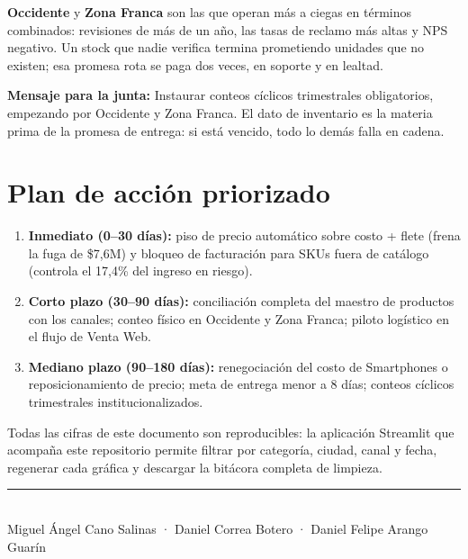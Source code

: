 \documentclass[11pt,letterpaper]{article}
\newcommand{\mensajeclave}[1]{%
  \vspace{4pt}
  \noindent\colorbox{grisclaro}{\parbox{\dimexpr\linewidth-2\fboxsep}{%
    \textbf{\textcolor{azuloscuro}{Mensaje para la junta:}} #1}}
  \vspace{4pt}
}
\begin{document}
\textbf{Occidente} y \textbf{Zona Franca} son las que operan más a ciegas en
términos combinados: revisiones de más de un año, las tasas de reclamo más
altas y NPS negativo. Un stock que nadie verifica termina prometiendo unidades
que no existen; esa promesa rota se paga dos veces, en soporte y en lealtad.

\mensajeclave{Instaurar conteos cíclicos trimestrales obligatorios, empezando
por Occidente y Zona Franca. El dato de inventario es la materia prima de la
promesa de entrega: si está vencido, todo lo demás falla en cadena.}

\section{Plan de acción priorizado}

\begin{enumerate}
  \item \textbf{Inmediato (0--30 días):} piso de precio automático sobre
        costo + flete (frena la fuga de \$7,6M) y bloqueo de facturación para
        SKUs fuera de catálogo (controla el 17,4\% del ingreso en riesgo).
  \item \textbf{Corto plazo (30--90 días):} conciliación completa del maestro
        de productos con los canales; conteo físico en Occidente y Zona
        Franca; piloto logístico en el flujo de Venta Web.
  \item \textbf{Mediano plazo (90--180 días):} renegociación del costo de
        Smartphones o reposicionamiento de precio; meta de entrega menor a
        8 días; conteos cíclicos trimestrales institucionalizados.
\end{enumerate}

Todas las cifras de este documento son reproducibles: la aplicación Streamlit
que acompaña este repositorio permite filtrar por categoría, ciudad, canal y
fecha, regenerar cada gráfica y descargar la bitácora completa de limpieza.

\vspace{1em}
\begin{center}
  \color{azuloscuro}\rule{0.6\linewidth}{1pt}\\[0.5em]
  \small Miguel Ángel Cano Salinas · Daniel Correa Botero · Daniel Felipe Arango Guarín
\end{center}
\end{document}
